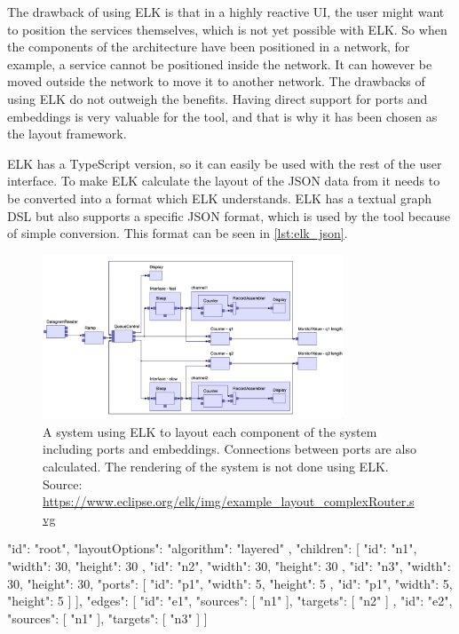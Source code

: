 The drawback of using ELK is that in a highly reactive UI, the user might want to position the services themselves, which is not yet possible with ELK.
So when the components of the architecture have been positioned in a network, for example, a service cannot be positioned inside the network. It can however be moved outside the network to move it to another network.
The drawbacks of using ELK do not outweigh the benefits. Having direct support for ports and embeddings is very valuable for the tool, and that is why it has been chosen as the layout framework.

ELK has a TypeScript version, so it can easily be used with the rest of the user interface. To make ELK calculate the layout of the JSON data from \javatoolname[] it needs to be converted into a format which ELK understands.
ELK has a textual graph DSL but also supports a specific JSON format, which is used by the tool because of simple conversion. This format can be seen in \cref{lst:elk_json}.

\begin{figure}[t]
    \center
    \includegraphics[width=0.80\textwidth]{figures/elk.png}
    \caption{A system using ELK to layout each component of the system including ports and embeddings. Connections between ports are also calculated. The rendering of the system is not done using ELK. Source: \url{https://www.eclipse.org/elk/img/example_layout_complexRouter.svg}}
    \label{figure:elk_example}
\end{figure}

\begin{jsonlisting}[][caption={The ELK JSON format}, label={lst:elk_json}]
{
    "id": "root",
    "layoutOptions": { "algorithm": "layered" },
    "children": [
        { "id": "n1", "width": 30, "height": 30 },
        { "id": "n2", "width": 30, "height": 30 },
        {
            "id": "n3",
            "width": 30,
            "height": 30,
            "ports": [
                { "id": "p1", "width": 5, "height": 5 },
                { "id": "p1", "width": 5, "height": 5 }
            ]
        }
    ],
    "edges": [
        { "id": "e1", "sources": [ "n1" ], "targets": [ "n2" ] },
        { "id": "e2", "sources": [ "n1" ], "targets": [ "n3" ] }
    ]
}
\end{jsonlisting}

